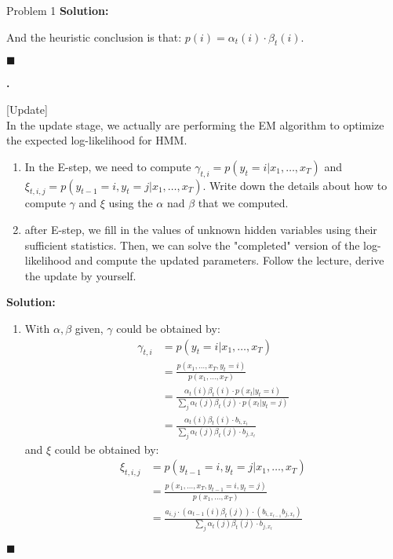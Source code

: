 \documentclass{article}
\newcounter{pcounter}                                   %
\newenvironment{problem}                                %
{                                                       %
    \color{gray}                                        %
    \stepcounter{pcounter}                              %
    \textbf{\arabic{pcounter}.}                         %
}{}                                                     %
\newenvironment{solution}                               %
{\textbf{Solution:} }{$\blacksquare$}                   %
\begin{document}
\begin{section}{Problem 1}
\begin{solution}
\begin{enumerate}[label=\alph*)]
                And the heuristic conclusion is that: $p(i)=\alpha_t(i) \cdot \beta_t(i)$.
            \end{enumerate}
        \end{solution}

        \begin{problem}
            [Update] \\
            In the update stage, we actually are performing the EM algorithm to optimize the expected log-likelihood for HMM.
            \begin{enumerate}[label=\alph*)]
                \item In the E-step, we need to compute $\gamma_{t,i}=p(y_t=i|x_1, \dots, x_T)$ and $\xi_{t,i,j} = p(y_{t-1}=i, y_{t}=j|x_1, \dots, x_T)$.
                Write down the details about how to compute $\gamma$ and $\xi$ using the $\alpha$ nad $\beta$ that we computed.

                \item after E-step, we fill in the values of unknown hidden variables using their sufficient statistics. Then, we can solve the "completed" version of the log-likelihood and compute the updated parameters. Follow the lecture, derive the update by yourself.
            \end{enumerate}
        \end{problem}

        \begin{solution}
            \begin{enumerate}[label=\alph*)]
                \item %
                With $\alpha, \beta$ given, $\gamma$ could be obtained by:
                \begin{align*}
                    \gamma_{t,i} &= p(y_t=i | x_1, \dots, x_T) \\
                    &= \frac{p(x_1, \dots, x_T, y_t=i)}{p(x_1, \dots, x_T)} \\
                    &= \frac{\alpha_t(i)\beta_t(i) \cdot p(x_t|y_t=i)}{\sum_j \alpha_t(j)\beta_t(j) \cdot p(x_t|y_t=j)} \\
                    &= \frac{\alpha_t(i)\beta_t(i) \cdot b_{i,x_t}}
                            {\sum_j \alpha_t(j)\beta_t(j) \cdot b_{j,x_t}}
                \end{align*}
                and $\xi$ could be obtained by:
                \begin{align*}
                    \xi_{t,i,j} &= p(y_{t-1}=i,y_t=j | x_1,\dots,x_T) \\
                    &= \frac{p(x_1,\dots,x_T, y_{t-1}=i, y_{t}=j)}{p(x_1, \dots, x_T)} \\
                    &= \frac{a_{i,j} \cdot (\alpha_{t-1}(i)\beta_{t}(j)) \cdot (b_{i,x_{t-1}}b_{j,x_t})}
                            {\sum_j \alpha_t(j)\beta_t(j) \cdot b_{j,x_t}}
                \end{align*}
                

\end{enumerate}
\end{solution}
\end{section}
\end{document}
